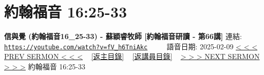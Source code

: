 \documentclass{book}
\begin{document}
\section{約翰福音 16:25-33}
\label{sec:fV_h6TniAkc}
\textbf{信與覺 (約翰福音16\_25-33) - 蘇穎睿牧師 [約翰福音研讀 - 第66講]}
\newline
\newline
連結: \href{https://youtube.com/watch?v=fV_h6TniAkc}{\texttt{https://youtube.com/watch?v=fV\_h6TniAkc}} ~~~~ 語音日期: 2025-02-09
\newline
\newline
\hyperref[sec:HaGDtN4u47U]{< < < PREV SERMON < < <}
~
\hyperlink{toc}{[返主目錄]}
~
\hyperref[ch:preacher11]{[返講員目錄]}
~
\hyperref[sec:wiDRWRXrtjM]{> > > NEXT SERMON > > >}
\newline
\newline
約翰福音 16:25-33
\newline
\end{document}
